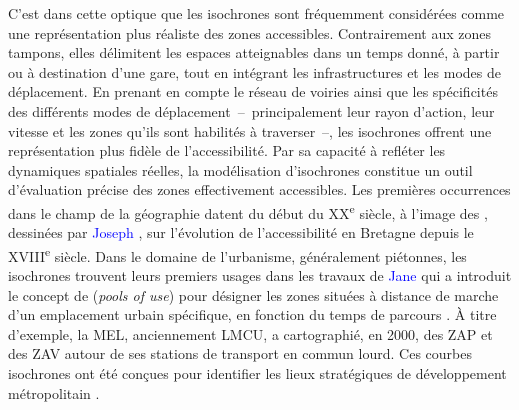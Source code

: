 \begin{refsegment}
C’est dans cette optique que les isochrones sont fréquemment considérées comme une représentation plus réaliste des zones accessibles. Contrairement aux zones tampons, elles délimitent les espaces atteignables dans un temps donné, à partir ou à destination d’une gare, tout en intégrant les infrastructures et les modes de déplacement. En prenant en compte le réseau de voiries ainsi que les spécificités des différents modes de déplacement~–~principalement leur rayon d'action, leur vitesse et les zones qu'ils sont habilités à traverser~–, les isochrones offrent une représentation plus fidèle de l’accessibilité. Par sa capacité à refléter les dynamiques spatiales réelles, la modélisation d'isochrones constitue un outil d'évaluation précise des zones effectivement accessibles. Les premières occurrences dans le champ de la géographie datent du début du XX\textsuperscript{e} siècle, à l'image des , dessinées par \textcolor{blue}{Joseph} \textcolor{blue}{\textcite[311-314]{letaconnoux_note_1907}}, sur l'évolution de l'accessibilité en Bretagne depuis le XVIII\textsuperscript{e} siècle. Dans le domaine de l'urbanisme, généralement piétonnes, les isochrones trouvent leurs premiers usages dans les travaux de \textcolor{blue}{Jane} \textcolor{blue}{\textcite[179-182]{jacobs_death_1961}} qui a introduit le concept de  (\textsl{pools of use}) pour désigner les zones situées à distance de marche d'un emplacement urbain spécifique, en fonction du temps de parcours \textcolor{blue}{\autocite[3]{dovey_isochrone_2017}}. À titre d’exemple, la \acrfull{MEL}, anciennement \acrfull{LMCU}, a cartographié, en 2000, des \acrfull{ZAP} et des \acrfull{ZAV} autour de ses stations de transport en commun lourd. Ces courbes isochrones ont été conçues pour identifier les lieux stratégiques de développement métropolitain \textcolor{blue}{\autocite[9]{heran_zones_2009}}.%
    

\end{refsegment}
